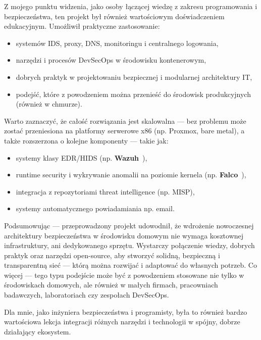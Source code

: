 \documentclass[
    left=2.5cm,         %
    right=2.5cm,        %
    top=2.5cm,          %
    bottom=3cm,         %
    bindingoffset=6mm,  %
    nohyphenation=true %
]{eiti/eiti-thesis} %
\begin{document}
Z mojego punktu widzenia, jako osoby łączącej wiedzę z zakresu programowania i bezpieczeństwa, ten projekt był również wartościowym doświadczeniem edukacyjnym. Umożliwił praktyczne zastosowanie:
\begin{itemize}
    \item systemów IDS, proxy, DNS, monitoringu i centralnego logowania,
    \item narzędzi i procesów DevSecOps w środowisku kontenerowym,
    \item dobrych praktyk w projektowaniu bezpiecznej i modularnej architektury IT,
    \item podejść, które z powodzeniem można przenieść do środowisk produkcyjnych (również w chmurze).
\end{itemize}

Warto zaznaczyć, że całość rozwiązania jest skalowalna — bez problemu może zostać przeniesiona na platformy serwerowe x86 (np. Proxmox, bare metal), a także rozszerzona o kolejne komponenty — takie jak:
\begin{itemize}
    \item systemy klasy EDR/HIDS (np. \textbf{Wazuh}~\cite{wazuh_agent}),
    \item runtime security i wykrywanie anomalii na poziomie kernela (np. \textbf{Falco}~\cite{falco_docs}),
    \item integracja z repozytoriami threat intelligence (np. MISP),
    \item systemy automatycznego powiadamiania np. email.
\end{itemize}

Podsumowując — przeprowadzony projekt udowodnił, że wdrożenie nowoczesnej architektury bezpieczeństwa w środowisku domowym nie wymaga kosztownej infrastruktury, ani dedykowanego sprzętu. Wystarczy połączenie wiedzy, dobrych praktyk oraz narzędzi open-source, aby stworzyć solidną, bezpieczną i transparentną sieć — którą można rozwijać i adaptować do własnych potrzeb. Co więcej — tego typu podejście może być z powodzeniem stosowane nie tylko w środowiskach domowych, ale również w małych firmach, pracowniach badawczych, laboratoriach czy zespołach DevSecOps.

Dla mnie, jako inżyniera bezpieczeństwa i programisty, była to również bardzo wartościowa lekcja integracji różnych narzędzi i technologii w spójny, dobrze działający ekosystem.



\newpage

\end{document}
